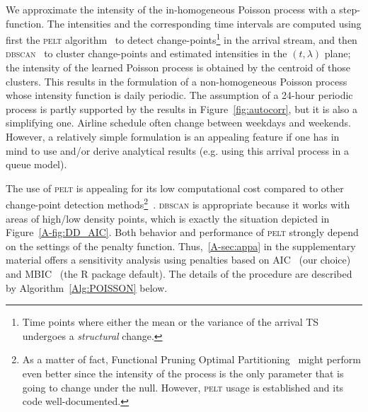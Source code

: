 \documentclass[final,review]{elsarticle}
\newcommand{\PELT}{\textsc{pelt}}
\newcommand{\DBSCAN}{\textsc{dbscan}}
\begin{document}
We approximate the intensity of the in-homogeneous Poisson process with a step-function.
The intensities and the corresponding time intervals are computed using first the \PELT{} algorithm~\citep{killick2012optimal} to detect change-points\footnote{Time points where either the mean or the variance of the arrival \ac{TS} undergoes a \emph{structural} change.} in the arrival stream, and then \DBSCAN{}~\citep{ester1996density,pedregosa2011scikit} to cluster change-points and estimated intensities in the \((t, \lambda)\) plane; the intensity of the learned Poisson process is obtained by the centroid of those clusters.
This results in the formulation of a non-homogeneous Poisson process whose intensity function is daily periodic. The assumption of a 24-hour periodic process is partly supported by the results in Figure~\ref{fig:autocorr}, but it is also a simplifying one. Airline schedule often change between weekdays and weekends. However, a relatively simple formulation is an appealing feature if one has in mind to use and/or derive analytical results (e.g. using this arrival process in a queue model).

The use of \PELT{} is appealing for its low computational cost compared to other change-point detection methods\footnote{As a matter of fact, Functional Pruning Optimal Partitioning~\citep{maidstone2017} might perform even better since the intensity of the process is the only parameter that is going to change under the null.
However, \PELT{} usage is established and its code well-documented.}~\citep{killick2012optimal}.
\DBSCAN{} is appropriate because it works with areas of high/low density points, which is exactly the situation depicted in Figure~\ref{A-fig:DD_AIC}.
Both behavior and performance of \PELT{} strongly depend on the settings of the penalty function.
Thus,~\ref{A-sec:appa} in the supplementary material offers a sensitivity analysis using penalties based on  \ac{AIC}~\citep{akaike1973information} (our choice) and \ac{MBIC}~\citep{zhang2007modified} (the R package default).
The details of the procedure are described by Algorithm~\ref{Alg:POISSON} below.

\end{document}
